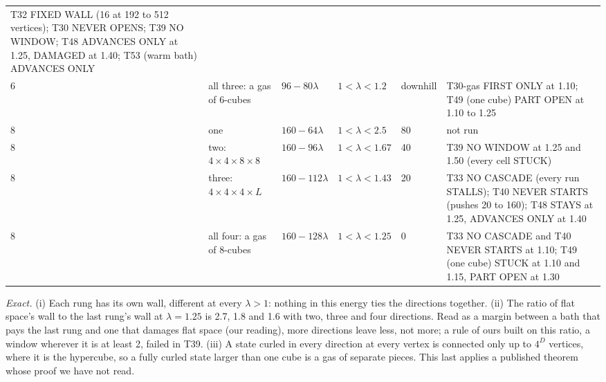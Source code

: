 \documentclass[aps,pre,10pt,twocolumn,superscriptaddress,nofootinbib]{revtex4-2}
\begin{document}
\begin{table}[t]
\begin{ruledtabular}
\begin{tabular}{lp{3.2cm}p{2.3cm}p{1.9cm}p{1.35cm}p{6.6cm}}
T32 FIXED WALL (16 at 192 to 512 vertices); T30 NEVER OPENS; T39 NO WINDOW; T48 ADVANCES ONLY at 1.25, DAMAGED
at 1.40; T53 (warm bath) ADVANCES ONLY \\
6 & all three: a gas of 6-cubes & $96-80\lambda$ & $1<\lambda<1.2$ & downhill &
T30-gas FIRST ONLY at 1.10; T49 (one cube) PART OPEN at 1.10 to 1.25 \\
8 & one & $160-64\lambda$ & $1<\lambda<2.5$ & 80 & not run \\
8 & two: $4\times4\times8\times8$ & $160-96\lambda$ & $1<\lambda<1.67$ & 40 &
T39 NO WINDOW at 1.25 and 1.50 (every cell STUCK) \\
8 & three: $4\times4\times4\times L$ & $160-112\lambda$ & $1<\lambda<1.43$ & 20 &
T33 NO CASCADE (every run STALLS); T40 NEVER STARTS (pushes 20 to 160); T48 STAYS at 1.25, ADVANCES ONLY at
1.40 \\
8 & all four: a gas of 8-cubes & $160-128\lambda$ & $1<\lambda<1.25$ & 0 &
T33 NO CASCADE and T40 NEVER STARTS at 1.10; T49 (one cube) STUCK at 1.10 and 1.15, PART OPEN at 1.30 \\
\end{tabular}
\end{ruledtabular}
\end{table}

\emph{Exact.} (i) Each rung has its own wall, different at every $\lambda>1$: nothing in this energy ties the
directions together. (ii) The ratio of flat
space's wall to the last rung's wall at $\lambda=1.25$ is 2.7, 1.8 and 1.6 with two, three and four directions.
Read as a margin between a bath that pays the last rung and one that damages flat space (our reading), more
directions leave less, not more; a rule of ours built on this ratio, a window wherever it is at least 2, failed
in T39. (iii) A state curled in every direction at every vertex is connected only up to $4^D$ vertices, where it
is the hypercube, so a fully curled state larger than one cube is a gas of separate pieces. This last applies a
published theorem \cite{Mul79} whose proof we have not read.
\end{document}
